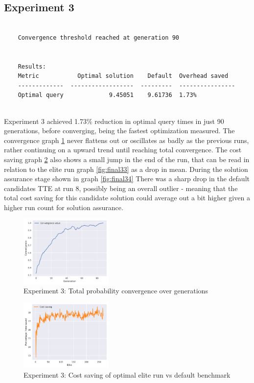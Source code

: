 \documentclass[a4paper,english]{report}
\begin{document}
	\subsection{Experiment 3}
	\begin{verbatim}
	
	Convergence threshold reached at generation 90
	
	
	Results:
	Metric           Optimal solution    Default  Overhead saved
	-------------  ------------------  ---------  ----------------
	Optimal query             9.45051    9.61736  1.73%
	
	\end{verbatim}
	Experiment 3 achieved 1.73\% reduction in optimal query times in just 90 generations, before converging, being the fastest optimization measured. The convergence graph \ref{fig:final31} never flattens out or oscillates as badly as the previous runs, rather continuing on a upward trend until reaching total convergence. The cost saving graph \ref{fig:final32} also shows a small jump in the end of the run, that can be read in relation to the elite run graph \ref{fig:final33} as a drop in mean. During the solution assurance stage shown in graph \ref{fig:final34} There was a sharp drop in the default candidates TTE at run 8, possibly being an overall outlier - meaning that the total cost saving for this candidate solution could average out a bit higher given a higher run count for solution assurance.
	\clearpage 
	\begin{figure}[H]
		\centering
		\includegraphics[width=130pt]{runlogs/final4/1}
		\caption{Experiment 3: Total probability convergence over generations}
		\label{fig:final31}
	\end{figure}
	\begin{figure}[H]
		\centering
		\includegraphics[width=130pt]{runlogs/final4/2}
		\caption{Experiment 3: Cost saving of optimal elite run vs default benchmark}
		\label{fig:final32}
	\end{figure}
\end{document}
